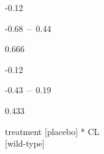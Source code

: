 \documentclass[
  letterpaper,
  DIV=11,
  numbers=noendperiod]{scrartcl}
\begin{document}
\begin{table}
\begin{minipage}[t]{\linewidth}
{-0.12

}

\end{minipage}%
\newline
\begin{minipage}[t]{\linewidth}

{\centering 

-0.68~--~0.44

}

\end{minipage}%
\newline
\begin{minipage}[t]{\linewidth}

{\centering 

0.666

}

\end{minipage}%
\newline
\begin{minipage}[t]{\linewidth}

{\centering 

-0.12

}

\end{minipage}%
\newline
\begin{minipage}[t]{\linewidth}

{\centering 

-0.43~--~0.19

}

\end{minipage}%
\newline
\begin{minipage}[t]{\linewidth}

{\centering 

0.433

}

\end{minipage}%
\newline
\begin{minipage}[t]{\linewidth}

{\centering 

treatment {[}placebo{]} * CL\\
{[}wild-type{]}

}

\end{minipage}%
\newline
\begin{minipage}[t]{\linewidth}

{\centering 

}
\end{minipage}
\end{table}
\end{document}
